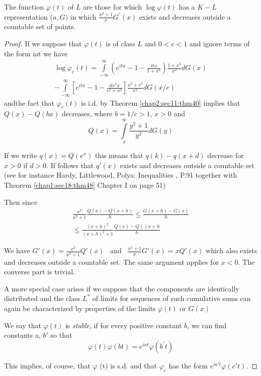 \begin{theorem}[P.L\'evy]\label{chap2:sec11:thm41}
 The function $\varphi (t)$ of $L$ are those for which $\log \varphi (t)$
 has a $K-L$ representation ($a, G)$ in which $\frac{x^2+1}{x} G^{'}(x)$
 exists and decreases outside a countable set of points. 
  \end{theorem}
   
\begin{proof}
  If we suppose that $\varphi (t)$ is of class $L$ and $0<c<1$ and
  ignore terms  of the form iat we have  
  \begin{multline*}
    \log
    \varphi_c(t)=\int\limits^{\infty}_{-\infty}
    \left(e^{itx}-1-\frac{itx}{1+x^2}\right) \frac{1+x^2}{x^2}d G(x) \\ 
    -\int\limits^{\infty}_{-\infty} \left[e^{itx}-1-\frac{itc^2x}{c^2+x^2}\right]
    \frac{x^2+c^2}{x^2} d G(x/c)  
  \end{multline*}
  and\pageoriginale the fact that $\varphi_c (t)$ is i.d. by
  Theorem \ref{chap2:sec11:thm40} implies that
  $Q(x)-Q(bx)$ decreases, where  $b=1/c>1$, $x>0$ and  
  $$
  Q(x)=\int\limits^{\infty}_{x}\frac{y^2+1}{y^2} d G (y)
  $$
  
  If we write $q(x)=Q(e^x)$ this means that $q(k)-q(x+d)$ decrease for
  $x>0$ if $d >0$. If follows that $q'(x)$ exists and decreases outside a
  countable set (see for instance Hardy, Littlewood, Polya: Inequalities
  , P.91 together with Theorem \ref{chap1:sec18:thm48} Chapter I on page 51)  
  
  Then since  
  \begin{multline*}
  \frac{x^2}{x^2+1}\frac{Q(x)-Q(x+h)}{h} \le \frac{G(x+h)-G(x)}{h}\\
  \le \frac{(x+h)^2}{(x+h)^2+1}\frac{Q(x)-Q()x+h}{h}
  \end{multline*}
  
  We have $G'(x)=\frac{x^2}{x^2+1} Q' (x)$ ~and~ $\frac{x^2+1}{x} G'
  (x)=x Q'(x)$ which also exists and decreases outside a countable
  set. The same
  argument applies for $x<0$. The converse part is trivial. 
  
  A more special case arises if we suppose that the components are
  identically distributed and the class $L^*$ of limits for sequences of
  such cumulative sums can again be characterized by properties of the
  limits $\varphi (t)$ or $G(x)$ 
  
  We say that $\varphi (t)$ is \textit{stable}, if for every positive constant
  $b$, we can find constants a, $b'$ so that    
  $$
  \varphi(t)\varphi(bt)=e^{iat}\varphi (b^{'}t)
  $$
  
  This implies, of course, that $\varphi$ (t) is s.d. and that
  $\varphi_c$ has the form $e^{ia't} \varphi (c't)$. 
\end{proof}

